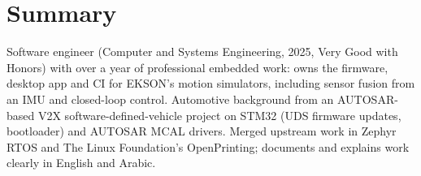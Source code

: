 \documentclass[10pt]{article}
\begin{document}

\section*{Summary}
Software engineer (Computer and Systems Engineering, 2025, Very Good with Honors) with over a year of professional embedded work: owns the firmware, desktop app and CI for EKSON's motion simulators, including sensor fusion from an IMU and closed-loop control. Automotive background from an AUTOSAR-based V2X software-defined-vehicle project on STM32 (UDS firmware updates, bootloader) and AUTOSAR MCAL drivers. Merged upstream work in Zephyr RTOS and The Linux Foundation's OpenPrinting; documents and explains work clearly in English and Arabic.
\end{document}
